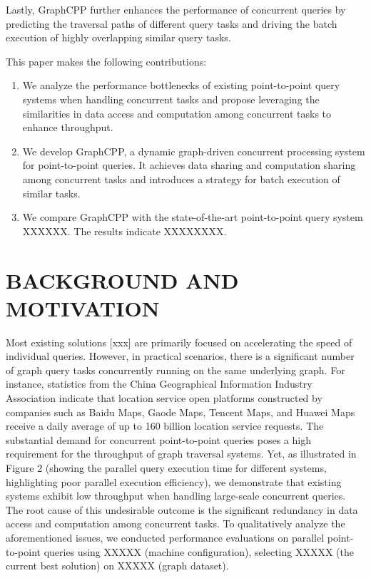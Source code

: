 \documentclass[lettersize,journal]{IEEEtran} %
\begin{document}
Lastly, GraphCPP further enhances the performance of concurrent queries by predicting the traversal paths of different query tasks and driving the batch execution of highly overlapping similar query tasks.

This paper makes the following contributions:
\begin{enumerate}
  \item{We analyze the performance bottlenecks of existing point-to-point query systems when handling concurrent tasks and propose leveraging the similarities in data access and computation among concurrent tasks to enhance throughput.}
  \item{We develop GraphCPP, a dynamic graph-driven concurrent processing system for point-to-point queries. It achieves data sharing and computation sharing among concurrent tasks and introduces a strategy for batch execution of similar tasks.}
  \item{We compare GraphCPP with the state-of-the-art point-to-point query system XXXXXX. The results indicate XXXXXXXX.}
\end{enumerate}

\section{BACKGROUND AND MOTIVATION}
Most existing solutions [xxx] are primarily focused on accelerating the speed of individual queries. However, in practical scenarios, there is a significant number of graph query tasks concurrently running on the same underlying graph. For instance, statistics from the China Geographical Information Industry Association indicate that location service open platforms constructed by companies such as Baidu Maps, Gaode Maps, Tencent Maps, and Huawei Maps receive a daily average of up to 160 billion location service requests. The substantial demand for concurrent point-to-point queries poses a high requirement for the throughput of graph traversal systems. Yet, as illustrated in Figure 2 (showing the parallel query execution time for different systems, highlighting poor parallel execution efficiency), we demonstrate that existing systems exhibit low throughput when handling large-scale concurrent queries. The root cause of this undesirable outcome is the significant redundancy in data access and computation among concurrent tasks. To qualitatively analyze the aforementioned issues, we conducted performance evaluations on parallel point-to-point queries using XXXXX (machine configuration), selecting XXXXX (the current best solution) on XXXXX (graph dataset).
\end{document}
